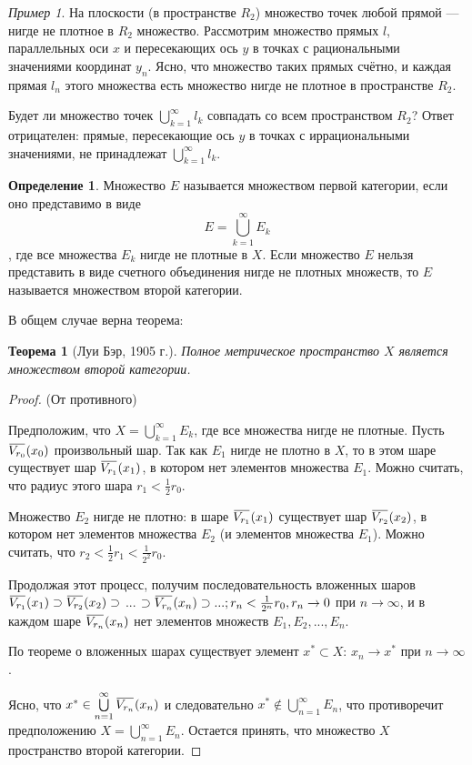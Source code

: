 \documentclass[12pt,a4paper,titlepage, oneside]{book}
\newcommand{\overbar}[1]{\mkern 1.5mu\overline{\mkern-1.5mu#1\mkern-1.5mu}\mkern 1.5mu}
\theoremstyle{definition}
\newtheorem*{definition}{Определение}
\theoremstyle{plain}
\newtheorem*{theorem}{Теорема}
\theoremstyle{remark}
\theoremstyle{remark}
\newtheorem*{example}{Пример}
\theoremstyle{remark}
\theoremstyle{remark}
\theoremstyle{plain}
\theoremstyle{plain}
\begin{document}
\begin{example}
На плоскости (в пространстве $R_2$) множество точек любой прямой --- нигде не плотное в $R_2$ множество.
Рассмотрим множество прямых $l$, параллельных оси $x$ и пересекающих ось $y$ в точках с рациональными значениями координат $y_n$. Ясно, что множество таких прямых счётно, и каждая прямая $l_n$ этого множества есть множество нигде не плотное в пространстве $R_2$.
\end{example}

Будет ли множество точек $\bigcup\limits_{k=1}^\infty l_k$ совпадать со всем пространством $R_2$? Ответ отрицателен: прямые, пересекающие ось $y$ в точках с иррациональными значениями, не принадлежат $\bigcup\limits_{k=1}^\infty l_k$.

\begin{definition}
Множество $E$ называется множеством первой категории, если оно представимо в виде 
$$E=\bigcup\limits_{k=1}^\infty E_k$$, 
где все множества $E_k$ нигде не плотные в $X$. Если множество $E$ нельзя представить в виде счетного объединения нигде не плотных множеств, то $E$ называется множеством второй категории.
\end{definition}

В общем случае верна теорема:

\begin{theorem}[Луи Бэр, 1905 г.]
Полное метрическое пространство $X$ является множеством второй категории.
\end{theorem}

\begin{proof}
(От противного)

Предположим, что $X=\bigcup\limits_{k=1}^\infty E_k$, где все множества нигде не плотные. Пусть $\overbar{V_{r_0}}(x_0)$ произвольный шар. Так как $E_1$ нигде не плотно в $X$, то в этом шаре существует шар $\overbar{V_{r_1}}(x_1)$, в котором нет элементов множества $E_1$. Можно считать, что радиус этого шара $r_1 < \frac{1}{2}r_0$.

Множество $E_2$ нигде не плотно: в шаре $\overbar{V_{r_1}}(x_1)$ существует шар $\overbar{V_{r_2}}(x_2)$, в котором нет элементов множества $E_2$ (и элементов множества $E_1$). Можно считать, что $r_2 < \frac{1}{2}r_1 < \frac{1}{2^2}r_0$.

Продолжая этот процесс, получим последовательность вложенных шаров $\overbar{V_{r_1}}(x_1) \supset \overbar{V_{r_2}}(x_2) \supset$ ... $\supset \overbar{V_{r_n}}(x_n) \supset ...; r_n < \frac{1}{2^n}r_0, r_n \to 0$ при $n \to \infty$, и в каждом шаре $\overbar{V_{r_n}}(x_n)$ нет элементов множеств $E_1, E_2, ..., E_n$.

По теореме о вложенных шарах существует элемент $x^*\subset X$:
$x_n \to x^*$ при $n \to \infty$.

Ясно, что $x^*\in \bigcup\limits_{n=1}^\infty \overbar{V_{r_n}}(x_n)$ и следовательно $x^*\notin \bigcup\limits_{n=1}^\infty E_n$, что противоречит предположению $X=\bigcup\limits_{n=1}^\infty E_n$. Остается принять, что множество $X$ пространство второй категории.

\end{proof}
\end{document}
